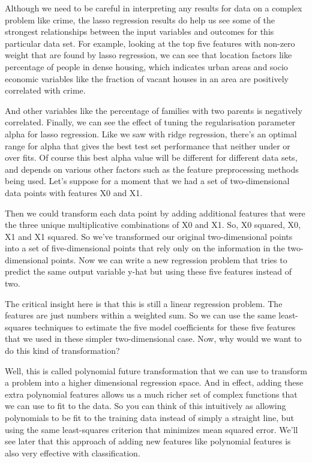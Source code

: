 \begin{multicols}{2}
Although we need to be careful in interpreting any results for data on a complex problem like crime, the lasso regression results do help us see some of the strongest relationships between the input variables and outcomes for this particular data set. For example, looking at the top five features with non-zero weight that are found by lasso regression, we can see that location factors like percentage of people in dense housing, which indicates urban areas and socio economic variables like the fraction of vacant houses in an area are positively correlated with crime. 

And other variables like the percentage of families with two parents is negatively correlated. Finally, we can see the effect of tuning the regularisation parameter alpha for lasso regression. Like we saw with ridge regression, there's an optimal range for alpha that gives the best test set performance that neither under or over fits. Of course this best alpha value will be different for different data sets, and depends on various other factors such as the feature preprocessing methods being used. Let's suppose for a moment that we had a set of two-dimensional data points with features X0 and X1. 

Then we could transform each data point by adding additional features that were the three unique multiplicative combinations of X0 and X1. So, X0 squared, X0, X1 and X1 squared. So we've transformed our original two-dimensional points into a set of five-dimensional points that rely only on the information in the two-dimensional points. Now we can write a new regression problem that tries to predict the same output variable y-hat but using these five features instead of two. 

The critical insight here is that this is still a linear regression problem. The features are just numbers within a weighted sum. So we can use the same least-squares techniques to estimate the five model coefficients for these five features that we used in these simpler two-dimensional case. Now, why would we want to do this kind of transformation? 

Well, this is called polynomial future transformation that we can use to transform a problem into a higher dimensional regression space. And in effect, adding these extra polynomial features allows us a much richer set of complex functions that we can use to fit to the data. So you can think of this intuitively as allowing polynomials to be fit to the training data instead of simply a straight line, but using the same least-squares criterion that minimizes mean squared error. We'll see later that this approach of adding new features like polynomial features is also very effective with classification. 


\end{multicols}
